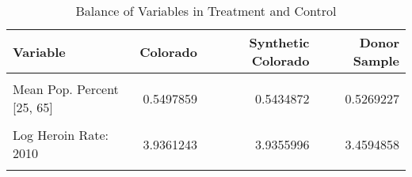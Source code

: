 \begin{table}[!h]

\caption{\label{tab:BalTab}Balance of Variables in Treatment and Control}
\centering
\begin{tabular}[t]{lrrr}
\toprule
Variable & Colorado & Synthetic Colorado & Donor Sample\\
\midrule
\cellcolor{gray!6}{Mean Pop. Percent [18, 24]} & \cellcolor{gray!6}{0.0972454} & \cellcolor{gray!6}{0.0990390} & \cellcolor{gray!6}{0.0994441}\\
Mean Pop. Percent [25, 65] & 0.5497859 & 0.5434872 & 0.5269227\\
\cellcolor{gray!6}{Log Heroin Rate: 2007} & \cellcolor{gray!6}{3.5716798} & \cellcolor{gray!6}{3.5725237} & \cellcolor{gray!6}{3.2717930}\\
Log Heroin Rate: 2010 & 3.9361243 & 3.9355996 & 3.4594858\\
\cellcolor{gray!6}{Log Heroin Rate: 2012} & \cellcolor{gray!6}{4.3587951} & \cellcolor{gray!6}{4.3579199} & \cellcolor{gray!6}{3.7027434}\\
\bottomrule
\end{tabular}
\end{table}

